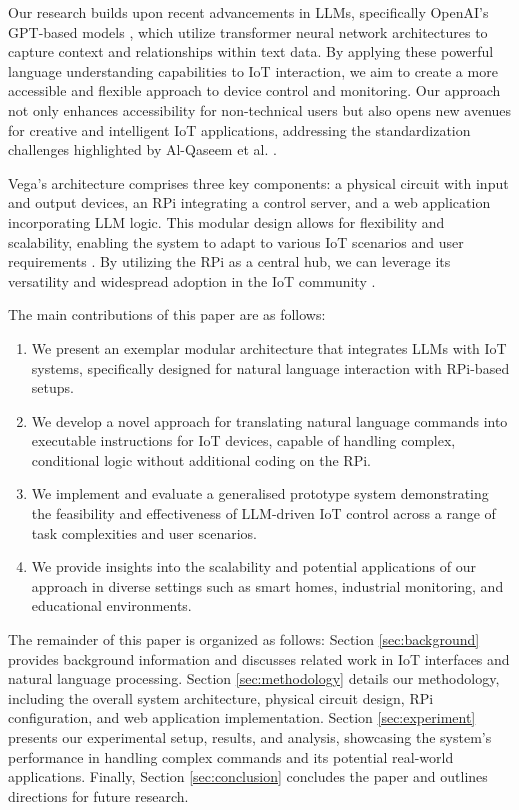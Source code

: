 \documentclass{ieeeaccess}
\begin{document}
Our research builds upon recent advancements in LLMs, specifically OpenAI's GPT-based models \cite{OpenAI_GPT}, which utilize transformer neural network architectures to capture context and relationships within text data. By applying these powerful language understanding capabilities to IoT interaction, we aim to create a more accessible and flexible approach to device control and monitoring. Our approach not only enhances accessibility for non-technical users but also opens new avenues for creative and intelligent IoT applications, addressing the standardization challenges highlighted by Al-Qaseem et al. \cite{7821686}.

Vega's architecture comprises three key components: a physical circuit with input and output devices, an RPi integrating a control server, and a web application incorporating LLM logic. This modular design allows for flexibility and scalability, enabling the system to adapt to various IoT scenarios and user requirements \cite{taylor2010software}. By utilizing the RPi as a central hub, we can leverage its versatility and widespread adoption in the IoT community \cite{8067944}.

The main contributions of this paper are as follows:

\begin{enumerate}
    \item We present an exemplar modular architecture that integrates LLMs with IoT systems, specifically designed for natural language interaction with RPi-based setups.
    \item We develop a novel approach for translating natural language commands into executable instructions for IoT devices, capable of handling complex, conditional logic without additional coding on the RPi.
    \item We implement and evaluate a generalised prototype system demonstrating the feasibility and effectiveness of LLM-driven IoT control across a range of task complexities and user scenarios.
    \item We provide insights into the scalability and potential applications of our approach in diverse settings such as smart homes, industrial monitoring, and educational environments.
\end{enumerate}

The remainder of this paper is organized as follows: Section \ref{sec:background} provides background information and discusses related work in IoT interfaces and natural language processing. Section \ref{sec:methodology} details our methodology, including the overall system architecture, physical circuit design, RPi configuration, and web application implementation. Section \ref{sec:experiment} presents our experimental setup, results, and analysis, showcasing the system's performance in handling complex commands and its potential real-world applications. Finally, Section \ref{sec:conclusion} concludes the paper and outlines directions for future research.
\end{document}
